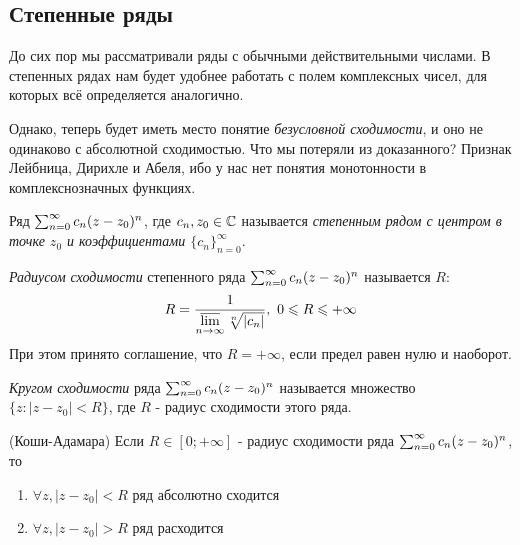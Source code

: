 \subsection{Степенные ряды}

\begin{note}
	До сих пор мы рассматривали ряды с обычными действительными числами. В степенных рядах нам будет удобнее работать с полем комплексных чисел, для которых всё определяется аналогично.
	
	Однако, теперь будет иметь место понятие \textit{безусловной сходимости}, и оно не одинаково с абсолютной сходимостью. Что мы потеряли из доказанного? Признак Лейбница, Дирихле и Абеля, ибо у нас нет понятия монотонности в комплекснозначных функциях.
\end{note}

\begin{definition}
	Ряд $\row{n = 0}{c_n(z - z_0)^n}$, где $c_n, z_0 \in \Cm$ называется \textit{степенным рядом с центром в точке $z_0$ и коэффициентами $\{c_n\}_{n = 0}^\infty$}.
\end{definition}

\begin{definition}
	\textit{Радиусом сходимости} степенного ряда $\row{n = 0}{c_n(z - z_0)^n}$ называется $R$:
	\[
		R = \frac{1}{\varlimsup\limits_{n \to \infty} \sqrt[n]{|c_n|}},\ 0 \le R \le +\infty
	\]
	При этом принято соглашение, что $R = +\infty$, если предел равен нулю и наоборот.
\end{definition}

\begin{definition}
	\textit{Кругом сходимости} ряда $\row{n = 0}{c_n(z - z_0)^n}$ называется множество $\{z \colon |z - z_0| < R\}$, где $R$ - радиус сходимости этого ряда.
\end{definition}

\begin{theorem} (Коши-Адамара)
	Если $R \in [0; +\infty]$ - радиус сходимости ряда $\row{n = 0}{c_n(z - z_0)^n}$, то
	\begin{enumerate}
		\item $\forall z, |z - z_0| < R$ ряд абсолютно сходится
		
		\item $\forall z, |z - z_0| > R$ ряд расходится
	\end{enumerate}
\end{theorem}

